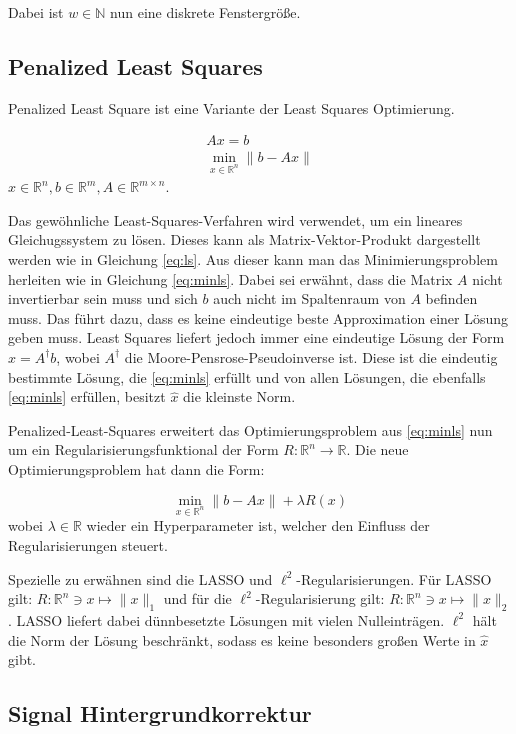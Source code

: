 \documentclass{article}
\newcommand{\R}[0]{\mathbb{R}}
\begin{document}
Dabei ist $w \in \mathbb{N}$ nun eine diskrete Fenstergröße.

\subsection{Penalized Least Squares}
Penalized Least Square ist eine Variante der Least Squares Optimierung.

\begin{align}
    Ax = b \label{eq:ls} \\ 
    \min\limits_{x \in \R^n} \lVert b - Ax \rVert \label{eq:minls}
\end{align}
$x \in \R^n, b \in \R^m, A \in \R^{m\times n}$.

Das gewöhnliche Least-Squares-Verfahren wird verwendet, um ein lineares Gleichugssystem zu lösen. 
Dieses kann als Matrix-Vektor-Produkt dargestellt werden wie in Gleichung \ref{eq:ls}. 
Aus dieser kann man das Minimierungsproblem herleiten wie in Gleichung \ref{eq:minls}.
Dabei sei erwähnt, dass die Matrix $A$ nicht invertierbar sein muss und sich $b$ auch nicht im Spaltenraum von $A$ befinden muss.
Das führt dazu, dass es keine eindeutige beste Approximation einer Lösung geben muss.
Least Squares liefert jedoch immer eine eindeutige Lösung der Form $\hat{x} = A^{\dagger} b$, wobei $A^{\dagger}$ die Moore-Pensrose-Pseudoinverse ist.
Diese ist die eindeutig bestimmte Lösung, die \ref{eq:minls} erfüllt und von allen Lösungen, die ebenfalls \ref{eq:minls} erfüllen, besitzt $\hat{x}$ die kleinste Norm.

Penalized-Least-Squares erweitert das Optimierungsproblem aus \ref{eq:minls} nun um ein Regularisierungsfunktional der Form $R: \R^n \to \R$.
Die neue Optimierungsproblem hat dann die Form:

\begin{equation}
    \min\limits_{x \in \R^n} \lVert b - Ax \rVert + \lambda R(x)
\end{equation}
wobei $\lambda \in \R$ wieder ein Hyperparameter ist, welcher den Einfluss der Regularisierungen steuert.

Spezielle zu erwähnen sind die LASSO und $\ell^2$-Regularisierungen. Für LASSO gilt: $R: \R^n \ni x \mapsto \lVert x \rVert_1$ und für die $\ell^2$-Regularisierung gilt: $R: \R^n \ni x \mapsto \lVert x \rVert_2$.
LASSO liefert dabei dünnbesetzte Lösungen mit vielen Nulleinträgen. 
$\ell^2$ hält die Norm der Lösung beschränkt, sodass es keine besonders großen Werte in $\hat{x}$ gibt.

\subsection{Signal Hintergrundkorrektur}
\end{document}
